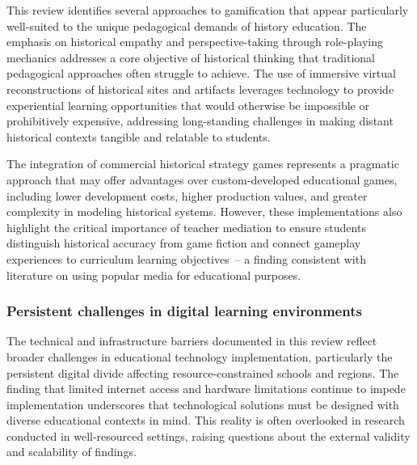 \documentclass[a4paper,fleqn]{cas-sc}
\begin{document}
This review identifies several approaches to gamification that appear particularly well-suited to the unique pedagogical demands of history education. The emphasis on historical empathy and perspective-taking through role-playing mechanics \citep{12Gilbert2019108, 29Stiso20201165, 42Huffer201581, 60Hoy2018, 71lynch2015pedagogical} addresses a core objective of historical thinking that traditional pedagogical approaches often struggle to achieve. The use of immersive virtual reconstructions of historical sites and artifacts \citep{1Barbatsis201159, 14Forsyth2023, 25Repantis2011502, 31DeAmicis2009451, 39Tegos2014838, 48Moketar2021} leverages technology to provide experiential learning opportunities that would otherwise be impossible or prohibitively expensive, addressing long-standing challenges in making distant historical contexts tangible and relatable to students.

The integration of commercial historical strategy games \citep{8Yu2014, 51Ardito2007, 55Squire2004, 56Akkerman2009449, 60Hoy2018, 65Razak201139, 66Rahmawati2023163, 67Lin201296, 70Hou201519} represents a pragmatic approach that may offer advantages over custom-developed educational games, including lower development costs, higher production values, and greater complexity in modeling historical systems. However, these implementations also highlight the critical importance of teacher mediation \citep{61Karsenti202027, 72hutauruk2020utilization} to ensure students distinguish historical accuracy from game fiction and connect gameplay experiences to curriculum learning objectives~-- a finding consistent with literature on using popular media for educational purposes.

\subsubsection{Persistent challenges in digital learning environments}

The technical and infrastructure barriers documented in this review \citep{40Kuran2018, 49Huizenga2007127, 60Hoy2018, 69Wong2017150, 77Ramansyah2021} reflect broader challenges in educational technology implementation, particularly the persistent digital divide affecting resource-constrained schools and regions. The finding that limited internet access \citep{77Ramansyah2021} and hardware limitations \citep{40Kuran2018, 49Huizenga2007127, 69Wong2017150} continue to impede implementation underscores that technological solutions must be designed with diverse educational contexts in mind. This reality is often overlooked in research conducted in well-resourced settings, raising questions about the external validity and scalability of findings.
\end{document}
